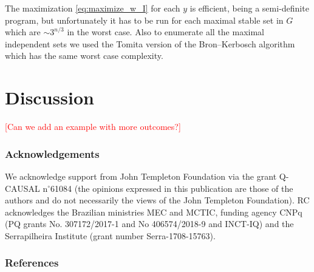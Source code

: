 \documentclass[letterpaper]{article}
\begin{document}
The maximization \eqref{eq:maximize_w_I} for each $y$ is efficient, being a
semi-definite program, but unfortunately it has to be run for each maximal
stable set in $G$ which are $\sim 3^{n/3}$ in the worst case.
Also to enumerate all the maximal independent sets we used the Tomita version of
the Bron–Kerbosch algorithm which has the same worst case
complexity\cite{tomita2006}.

\section*{Discussion}

\textcolor{red}{[Can we add an example with more outcomes?]}


\subsubsection*{Acknowledgements}
We acknowledge support from John Templeton Foundation via the grant Q-CAUSAL n$^{\circ}$61084 (the opinions expressed in this publication are those of the authors and do not necessarily  the views of the John Templeton
Foundation). RC acknowledges the Brazilian ministries MEC and MCTIC, funding agency CNPq (PQ grants No. 307172/2017-1 and No 406574/2018-9 and INCT-IQ) and the Serrapilheira Institute (grant number Serra-1708-15763).


\subsubsection*{References}
\end{document}
